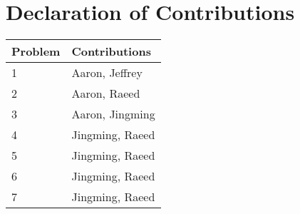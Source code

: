 \section*{Declaration of Contributions}
\begin{table}[htp]
\centering
\begin{tabular}{|l|l|}
\hline
    Problem & Contributions             \\ \hline
    1       & Aaron, Jeffrey            \\ \hline
    2       & Aaron, Raeed              \\ \hline
    3       & Aaron, Jingming           \\ \hline
    4       & Jingming, Raeed           \\ \hline
    5       & Jingming, Raeed           \\ \hline
    6       & Jingming, Raeed           \\ \hline
    7       & Jingming, Raeed           \\ \hline
\end{tabular}
\end{table}